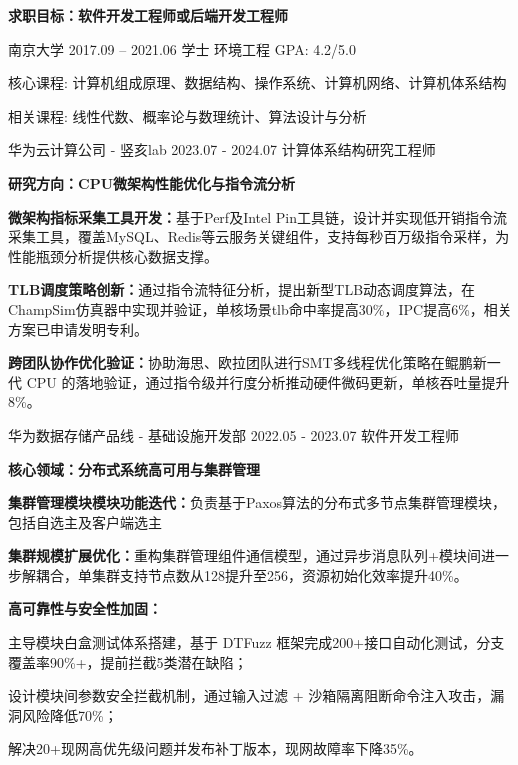 \documentclass{resume}
\begin{document}
\begin{CJK}{UTF8}{gbsn}

\noindent\textbf{求职目标：软件开发工程师或后端开发工程师}

\begin{EducationSection}
  \begineducationitem
    { 南京大学 }
    { 2017.09 -- 2021.06 }
    { 学士 环境工程}
    {GPA: 4.2/5.0 }
    \item 核心课程: 计算机组成原理、数据结构、操作系统、计算机网络、计算机体系结构
    \item 相关课程: 线性代数、概率论与数理统计、算法设计与分析
  \endeducationitem
\end{EducationSection}

\begin{WorkExperienceSection}
  \beginworkitem
    { 华为云计算公司 - 竖亥lab }
    { 2023.07 - 2024.07 }
    { 计算体系结构研究工程师 }
    \item \textbf{研究方向：CPU微架构性能优化与指令流分析}
    \item \textbf{微架构指标采集工具开发：}基于Perf及Intel Pin工具链，设计并实现低开销指令流采集工具，覆盖MySQL、Redis等云服务关键组件，支持每秒百万级指令采样，为性能瓶颈分析提供核心数据支撑。
    \item \textbf{TLB调度策略创新：}通过指令流特征分析，提出新型TLB动态调度算法，在ChampSim仿真器中实现并验证，单核场景tlb命中率提高30\%，IPC提高6\%，相关方案已申请发明专利。
    \item \textbf{跨团队协作优化验证：}协助海思、欧拉团队进行SMT多线程优化策略在鲲鹏新一代 CPU 的落地验证，通过指令级并行度分析推动硬件微码更新，单核吞吐量提升8\%。
  \endworkitem

  \beginworkitem
    { 华为数据存储产品线 - 基础设施开发部 }
    { 2022.05 - 2023.07 }
    { 软件开发工程师 }
    \item \textbf{核心领域：分布式系统高可用与集群管理}
    \item \textbf{集群管理模块模块功能迭代：}负责基于Paxos算法的分布式多节点集群管理模块，包括自选主及客户端选主
    \item \textbf{集群规模扩展优化：}重构集群管理组件通信模型，通过异步消息队列+模块间进一步解耦合，单集群支持节点数从128提升至256，资源初始化效率提升40\%。
    \item \textbf{高可靠性与安全性加固：}\par
    \hspace{1.8em} 主导模块白盒测试体系搭建，基于 DTFuzz 框架完成200+接口自动化测试，分支覆盖率90\%+，提前拦截5类潜在缺陷；\par
    \hspace{1.8em} 设计模块间参数安全拦截机制，通过输入过滤 + 沙箱隔离阻断命令注入攻击，漏洞风险降低70\%；\par
    \hspace{1.8em} 解决20+现网高优先级问题并发布补丁版本，现网故障率下降35\%。\par
  \endworkitem
\end{WorkExperienceSection}


\end{CJK}
\end{document}
